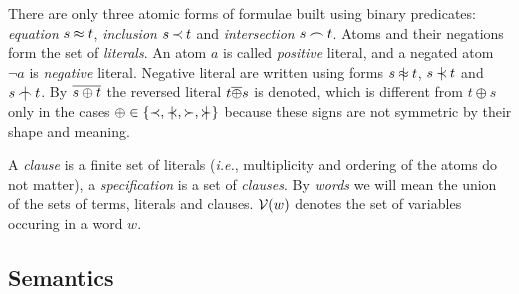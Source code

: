 There are only three atomic forms of formulae built using binary predicates: 
{\em equation} $s\mathbin{\approx} t$, {\em inclusion} $s\mathbin{\prec} t$ and {\em intersection} 
$s\mathbin{\frown} t$. Atoms and their negations form the set of {\em literals}. An atom 
$a$ is called {\em positive} literal, and a negated atom $\neg a$ is {\em 
negative} literal. Negative literal are written using forms $s\notEq t$, 
$s\notIncl t$ and $s\notInt t$.  By \(\overline{s\oplus t}\) the reversed literal
\(t\overline{\oplus} s\) is denoted, which is different from \(t\oplus s\) only in
the cases \(\oplus\in\{\Incl,\notIncl,\Cont,\notCont\}\) because these signs
are not symmetric by their shape and meaning.

A {\em clause} is a finite set of literals ({\em i.e.}, multiplicity and
ordering of the atoms do not matter), a {\em specification} is a set of {\em
clauses}.  
%
%
By {\em words} we will mean the union of the sets of terms, literals and
clauses.  \({\cal V}(w)\) denotes the set of variables occuring in a word $w$.

\subsection{Semantics}

